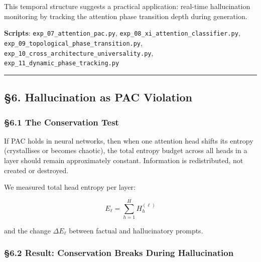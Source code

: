 \documentclass[
  11pt,
  a4paper]{article}
\begin{document}
This temporal structure suggests a practical application: real-time
hallucination monitoring by tracking the attention phase transition
depth during generation.

\textbf{Scripts}: \texttt{exp\_07\_attention\_pac.py},
\texttt{exp\_08\_xi\_attention\_classifier.py},
\texttt{exp\_09\_topological\_phase\_transition.py},
\texttt{exp\_10\_cross\_architecture\_universality.py},
\texttt{exp\_11\_dynamic\_phase\_tracking.py}

\begin{center}\rule{0.5\linewidth}{0.5pt}\end{center}

\subsection{§6. Hallucination as PAC
Violation}\label{hallucination-as-pac-violation}

\subsubsection{§6.1 The Conservation Test}\label{the-conservation-test}

If PAC holds in neural networks, then when one attention head shifts its
entropy (crystallises or becomes chaotic), the total entropy budget
across all heads in a layer should remain approximately constant.
Information is redistributed, not created or destroyed.

We measured total head entropy per layer:

\[E_\ell = \sum_{h=1}^{H} H_h^{(\ell)}\]

and the change \(\Delta E_\ell\) between factual and hallucinatory
prompts.

\subsubsection{§6.2 Result: Conservation Breaks During
Hallucination}\label{result-conservation-breaks-during-hallucination}
\end{document}

